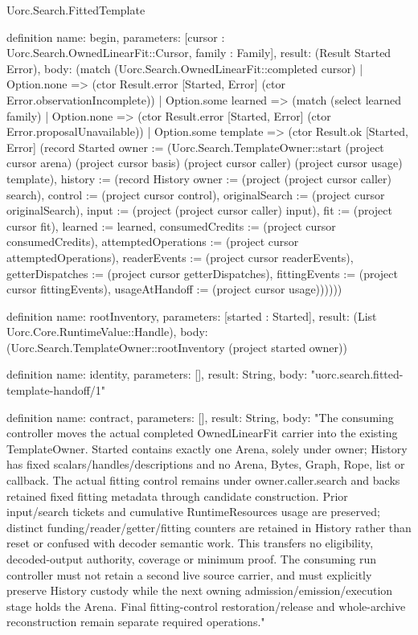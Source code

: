 \begin{lexlean}{Uorc.Search.FittedTemplate}
\begin{semanticmodule}
definition{
  name: begin,
  parameters: [cursor : Uorc.Search.OwnedLinearFit::Cursor, family : Family],
  result: (Result Started Error),
  body: (match (Uorc.Search.OwnedLinearFit::completed cursor)
    | Option.none => (ctor Result.error [Started, Error] (ctor Error.observationIncomplete))
    | Option.some learned => (match (select learned family)
      | Option.none => (ctor Result.error [Started, Error] (ctor Error.proposalUnavailable))
      | Option.some template => (ctor Result.ok [Started, Error] (record Started {owner := (Uorc.Search.TemplateOwner::start (project cursor arena) (project cursor basis) (project cursor caller) (project cursor usage) template), history := (record History {owner := (project (project cursor caller) search), control := (project cursor control), originalSearch := (project cursor originalSearch), input := (project (project cursor caller) input), fit := (project cursor fit), learned := learned, consumedCredits := (project cursor consumedCredits), attemptedOperations := (project cursor attemptedOperations), readerEvents := (project cursor readerEvents), getterDispatches := (project cursor getterDispatches), fittingEvents := (project cursor fittingEvents), usageAtHandoff := (project cursor usage)})}))))
}

definition{
  name: rootInventory,
  parameters: [started : Started],
  result: (List Uorc.Core.RuntimeValue::Handle),
  body: (Uorc.Search.TemplateOwner::rootInventory (project started owner))
}

definition{
  name: identity,
  parameters: [],
  result: String,
  body: "uorc.search.fitted-template-handoff/1"
}

definition{
  name: contract,
  parameters: [],
  result: String,
  body: "The consuming controller moves the actual completed OwnedLinearFit carrier into the existing TemplateOwner. Started contains exactly one Arena, solely under owner; History has fixed scalars/handles/descriptions and no Arena, Bytes, Graph, Rope, list or callback. The actual fitting control remains under owner.caller.search and backs retained fixed fitting metadata through candidate construction. Prior input/search tickets and cumulative RuntimeResources usage are preserved; distinct funding/reader/getter/fitting counters are retained in History rather than reset or confused with decoder semantic work. This transfers no eligibility, decoded-output authority, coverage or minimum proof. The consuming run controller must not retain a second live source carrier, and must explicitly preserve History custody while the next owning admission/emission/execution stage holds the Arena. Final fitting-control restoration/release and whole-archive reconstruction remain separate required operations."
}
\end{semanticmodule}
\end{lexlean}
